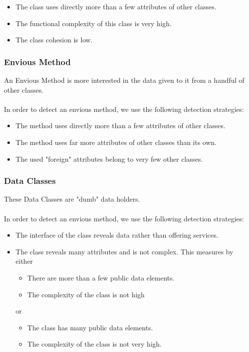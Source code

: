 \documentclass{article}
\begin{document}
\begin{itemize}
	\item The class uses directly more than a few attributes of other classes.
	
	\item The functional complexity of this class is very high.
	
	\item The class cohesion is low.
\end{itemize}

\subsubsection{Envious Method}
An Envious Method is more interested in the data given to it from a handful of other classes. \\ \\
In order to detect an envious method, we use the following detection strategies:

\begin{itemize}
	\item The method uses directly more than a few attributes of other classes.
	
	\item The method uses far more attributes of other classes than its own.
	
	\item The used "foreign" attributes belong to very few other classes.
\end{itemize}

\subsubsection{Data Classes}
These Data Classes are "dumb" data holders. \\ \\
In order to detect an envious method, we use the following detection strategies:

\begin{itemize}
	\item The interface of the class reveals data rather than offering services.
	
	\item The class reveals many attributes and is not complex. This measures by either
	\begin{itemize}
		\item There are more than a few public data elements.
		\item The complexity of the class is not high
	\end{itemize}
	or
	\begin{itemize}
		\item The class has many public data elements.
		
		\item The complexity of the class is not very high.
	\end{itemize}
\end{itemize}
\end{document}

